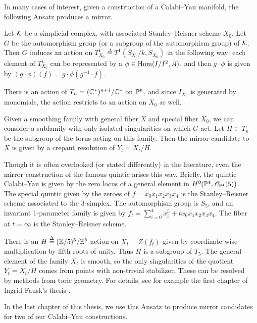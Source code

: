 In many cases of interest, given a construction of a Calabi--Yau manifold, the following Ansatz produces a mirror.

Let $\K$ be a simplicial complex, with associated Stanley--Reisner scheme $X_0$. Let $G$ be the automorphism group (or a subgroup of the automorphism group) of $\K$. Then $G$ induces an action on $T^1_{X_0} \stackrel \Delta = T^1(S_{X_0}/k,S_{X_0})$ in the following way: each element of $T_{X_0}^1$ can be represented by a $\phi \in \Hom(I/I^2,A)$, and then $g \cdot \phi$ is given by $(g \cdot \phi)(f) = g \cdot \phi(g^{-1} \cdot f)$.

There is an action of $T_n=(\C^\ast)^{n+1}/\C^\ast$ on $\P^n$, and since $I_{X_0}$ is generated by monomials, the action restricts to an action on $X_0$ as well.

Given a smoothing family with general fiber $X$ and special fiber $X_0$, we can consider a subfamily with only isolated singularities on which $G$ act.  Let $H \subset T_n$ be the subgroup of the torus acting on this family. Then the mirror candidate to $X$ is given by a crepant resolution of $Y_t=X_t/H$.

Though it is often overlooked (or stated differently) in the literature, even the mirror construction of the famous quintic arises this way. Briefly, the quintic Calabi--Yau is given by the zero locus of a general element in $H^0(\P^4,\OO_{\P^4}(5))$. The special quintic given by the zeroes of $f=x_0x_1x_2x_3x_4$ is the Stanley--Reisner scheme associated to the $3$-simplex. The automorphism group is $S_5$, and an invariant $1$-parameter family is given by $f_t=\sum_{i=0}^4 x_i^5 + t x_0 x_1x_2x_3x_4$. The fiber at $t=\infty$ is the Stanley--Reisner scheme.

There is an $H \stackrel \Delta = (\Z/5)^5/\Z^5$-action on $X_t = Z(f_t)$ given by coordinate-wise multiplication by fifth roots of unity. Thus $H$ is a subgroup of $T_5$. The general element of the family $X_t$ is smooth, so the only singularities of the quotient $Y_t=X_t/H$ comes from points with non-trivial stabilizer. These can be resolved by methods from toric geometry. For details, see for example the first chapter of Ingrid Fausk's thesis \cite{fausk_thesis}.

In the last chapter of this thesis, we use this Ansatz to produce mirror candidates for two of our Calabi--Yau constructions.